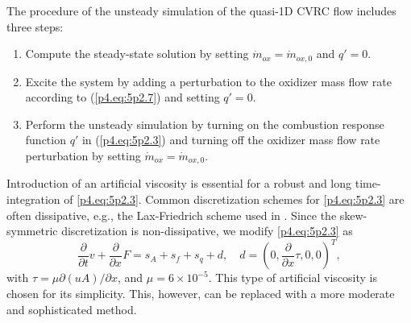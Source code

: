 The procedure of the unsteady simulation of the quasi-1D CVRC flow includes three steps:
\begin{enumerate} [label={\arabic*.}]
	\item  Compute the steady-state solution by setting $\dot{m}_{ox}=\dot{m}_{ox,0} $ and $q'=0$.
	\item  Excite the system by adding a perturbation to the oxidizer mass flow rate according to (\ref{p4.eq:5p2.7}) and setting $q'=0$.
	\item  Perform the unsteady simulation by turning on the combustion response function $q'$ in (\ref{p4.eq:5p2.3}) and turning off the oxidizer mass flow rate perturbation by setting $\dot{m}_{ox}=\dot{m}_{ox,0} $.	
\end{enumerate}
Introduction of an artificial viscosity is essential for a robust and long time-integration of \eqref{p4.eq:5p2.3}. Common discretization schemes for \eqref{p4.eq:5p2.3} are often dissipative, e.g., the Lax-Friedrich scheme used in \cite{Wang:255719}. Since the skew-symmetric discretization is non-dissipative, we modify \eqref{p4.eq:5p2.3} as
\begin{equation} \label{p4.eq:5p2.10} 
	\frac{\partial }{\partial t} v + \frac{\partial }{\partial x} F = s_A + s_f + s_q + d, \quad d = (0,\frac{\partial }{\partial x} \tau,0,0)^T,
\end{equation}
with $\tau = \mu \partial (u A)/ \partial x$, and $\mu = 6\times 10^{-5}$. This type of artificial viscosity is chosen for its simplicity. This, however, can be replaced with a more moderate and sophisticated method. 

